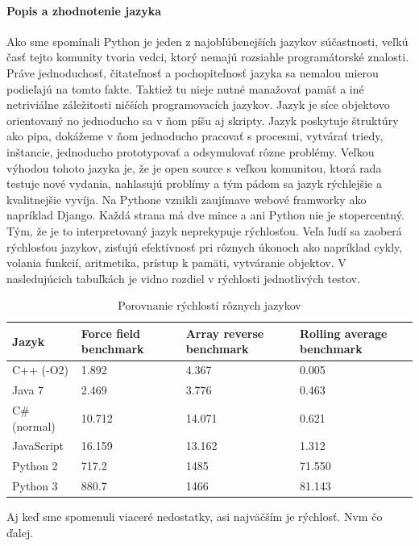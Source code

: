 \paragraph{Popis a zhodnotenie jazyka}
\indent Ako sme spomínali Python je jeden z najobľúbenejších jazykov súčastnosti, veľkú časť tejto komunity tvoria vedci, ktorý nemajú rozsiahle programátorské znalosti. Práve jednoduchosť, čitateľnosť a pochopiteľnosť jazyka sa nemalou mierou podieľajú na tomto fakte. Taktiež tu nieje nutné manažovať pamäť a iné netriviálne záležitosti ničších programovacích jazykov. Jazyk je síce objektovo orientovaný no jednoducho sa v ňom píšu aj skripty.  Jazyk poskytuje štruktúry ako pipa, dokážeme v ňom jednoducho pracovať s procesmi, vytvárať triedy, inštancie, jednoducho prototypovať a odsymulovať rôzne problémy. Veľkou výhodou tohoto jazyka je, že je open source s veľkou komunitou, ktorá rada testuje nové vydania, nahlasujú problímy a tým pádom sa jazyk rýchlejšie a kvalitnejšie vyvíja. Na Pythone vznikli zaujímave webové framworky ako napríklad Django. Každá strana má dve mince a ani Python nie je stopercentný. Tým, že je to interpretovaný jazyk neprekypuje rýchlosťou. Veľa ľudí sa zaoberá rýchlosťou jazykov, zisťujú efektívnosť pri rôznych úkonoch ako napríklad cykly, volania funkcií, aritmetika, prístup k pamäti, vytváranie objektov. V nasledujúcich tabuľkách je vidno rozdiel v rýchlosti jednotlivých testov. 
\begin{center}
	\begin{table}[htbp]
		\begin{tabular}{|p{2.5cm}|p{2.5cm}|p{2.5cm}|p{2.5cm}|}
			\hline
			\textbf{Jazyk} & \textbf{Force field benchmark}  & \textbf{Array reverse benchmark}&\textbf{Rolling average benchmark} \\ 
			\hline
			C++ (-O2)&1.892&4.367&0.005\\
			\hline
			Java 7&2.469&3.776&0.463\\
			\hline
			C\# (normal)&10.712&14.071&0.621\\
			\hline
			JavaScript&16.159&13.162&1.312\\
			\hline
			Python 2&717.2&1485&71.550\\
			\hline
			Python 3&880.7&1466&81.143\\
			\hline
		\end{tabular}
		\caption{Porovnanie rýchlostí rôznych jazykov\cite{gitspeed}}
		\label{table:1}
	\end{table}
\end{center}
Aj keď sme spomenuli viaceré nedostatky, asi najväčším je rýchlosť. Nvm čo ďalej. 
